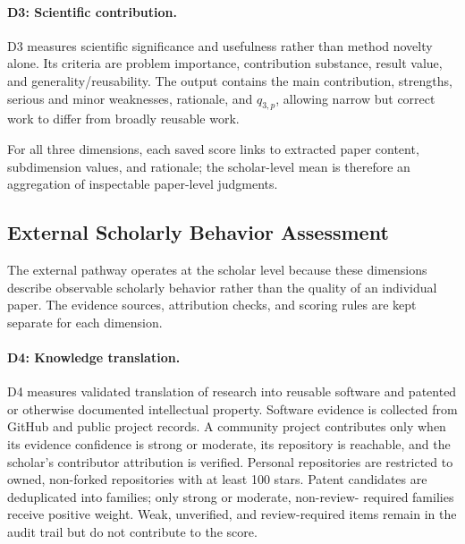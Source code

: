 \documentclass[letterpaper]{article} %
\begin{document}
\paragraph{D3: Scientific contribution.}
D3 measures scientific significance and usefulness rather than method novelty alone. Its criteria are problem importance, contribution substance, result value, and generality/reusability. The output contains the main contribution, strengths, serious and minor weaknesses, rationale, and $q_{3,p}$, allowing narrow but correct work to differ from broadly reusable work.

For all three dimensions, each saved score links to extracted paper content, subdimension values, and rationale; the scholar-level mean is therefore an aggregation of inspectable paper-level judgments.

\subsection{External Scholarly Behavior Assessment}
\label{sec:external}

The external pathway operates at the scholar level because these dimensions describe observable scholarly behavior rather than the quality of an individual paper. The evidence sources, attribution checks, and scoring rules are kept separate for each dimension.

\paragraph{D4: Knowledge translation.}
D4 measures validated translation of research into reusable software and patented
or otherwise documented intellectual property. Software evidence is collected
from GitHub and public project records. A community project contributes only when
its evidence confidence is strong or moderate, its repository is reachable, and
the scholar's contributor attribution is verified. Personal repositories are
restricted to owned, non-forked repositories with at least 100 stars. Patent
candidates are deduplicated into families; only strong or moderate, non-review-
required families receive positive weight. Weak, unverified, and review-required
items remain in the audit trail but do not contribute to the score.
\end{document}
